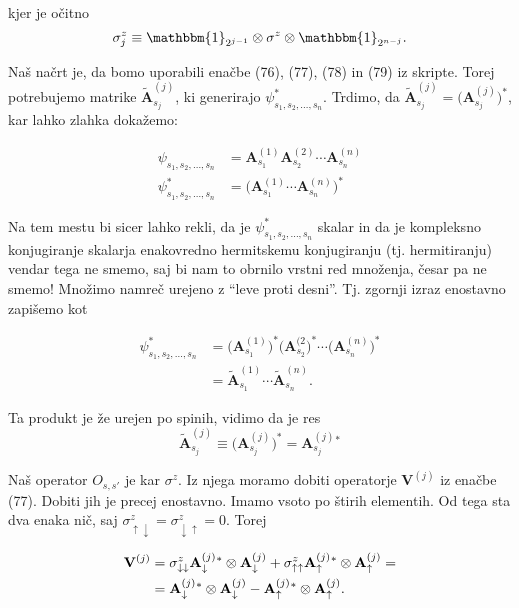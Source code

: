\documentclass[12pt, a4 paper]{article}
\begin{document}
kjer je o\v citno
\[
	\sigma_j^z \equiv \mathbbm{1}_{2^{j-1}} \otimes \sigma^z \otimes \mathbbm{1}_{2^{n-j}}.
\]

Na\v s na\v crt je, da bomo uporabili ena\v cbe (76), (77), (78) in (79) iz skripte. Torej potrebujemo matrike
$\tilde{\mathbf{A}}^{(j)}_{s_j}$, ki generirajo $\psi^*_{s_1,s_2,\ldots,s_n}$. Trdimo, da $\tilde{\mathbf{A}}^{(j)}_{s_j} =
\big(\mathbf{A}^{(j)}_{s_j}\big)^*$, kar lahko zlahka doka\v zemo:

\begin{align*}
	\psi_{s_1,s_2,\ldots,s_n} &= \mathbf{A}^{(1)}_{s_1} \mathbf{A}^{(2)}_{s_2} \cdots \mathbf{A}^{(n)}_{s_n} \\
	\psi^*_{s_1,s_2,\ldots,s_n} &= \Big(\mathbf{A}^{(1)}_{s_1} \cdots \mathbf{A}^{(n)}_{s_n}\Big)^*
\end{align*}

Na tem mestu bi sicer lahko rekli, da je $\psi^*_{s_1,s_2,\ldots,s_n}$ skalar in da je kompleksno konjugiranje skalarja
enakovredno hermitskemu konjugiranju (tj. hermitiranju) vendar tega ne smemo, saj bi nam to obrnilo vrstni red mno\v zenja,
\v cesar pa ne smemo! Mno\v zimo namre\v c urejeno z "`leve proti desni"'. Tj. zgornji izraz enostavno zapi\v semo kot

\begin{align*}
	\psi^*_{s_1,s_2,\ldots,s_n} &= \big(\mathbf{A}^{(1)}_{s_1}\big)^* \big(\mathbf{A}^{(2}_{s_2}\big)^* \cdots
		\big(\mathbf{A}^{(n)}_{s_n}\big)^* \\
		&= \tilde{\mathbf{A}}^{(1)}_{s_1} \cdots \tilde{\mathbf{A}}^{(n)}_{s_n}.
\end{align*}

Ta produkt je \v ze urejen po spinih, vidimo da je res
\[
	\tilde{\mathbf{A}}^{(j)}_{s_j} \equiv \big(\mathbf{A}^{(j)}_{s_j}\big)^* = \mathbf{A}^{(j)}_{s_j}{}^*
\]

Na\v s operator $O_{s,s'}$ je kar $\sigma^z$. Iz njega moramo dobiti operatorje $\mathbf{V}^{(j)}$ iz ena\v cbe (77). Dobiti
jih je precej enostavno. Imamo vsoto po \v stirih elementih. Od tega sta dva enaka ni\v c, saj $\sigma^z_{\uparrow\downarrow}
= \sigma^z_{\downarrow\uparrow} = 0$. Torej

\begin{align}
	\mathbf{V}^{(j)} &= \sigma^z_{\downarrow\downarrow} \mathbf{A}^{(j)}_{\downarrow}{}^* \otimes
		\mathbf{A}^{(j)}_{\downarrow} + \sigma^z_{\uparrow\uparrow} \mathbf{A}^{(j)}_{\uparrow}{}^*
		\otimes \mathbf{A}^{(j)}_{\uparrow} = \notag \\
		&= \mathbf{A}^{(j)}_{\downarrow}{}^* \otimes \mathbf{A}^{(j)}_{\downarrow} - \mathbf{A}^{(j)}_\uparrow{}^*
		\otimes \mathbf{A}^{(j)}_\uparrow.
\end{align}
\end{document}

